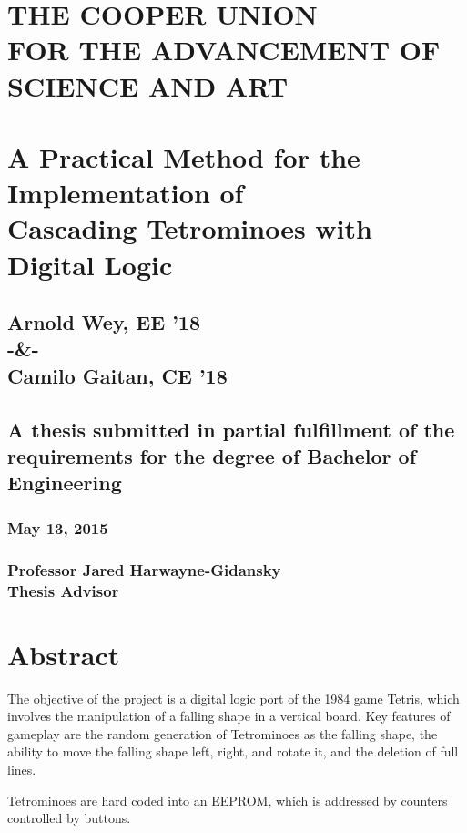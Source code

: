 \documentclass[letterpaper,titlepage,&1&pt,oneside]{article}
\begin{document}
\begin{center}
\section*{THE COOPER UNION \\FOR THE ADVANCEMENT OF SCIENCE AND ART\\[35pt]}
\section*{A Practical Method for the Implementation of \\Cascading Tetrominoes with Digital Logic\\[35pt]}
\subsection*{Arnold Wey, EE '18 \\[15pt]-\&-\\[15pt] Camilo Gaitan, CE '18\\[75pt]}
\subsection*{A thesis submitted in partial fulfillment of the requirements for the degree of Bachelor of Engineering\\[75pt]}
\subsubsection*{May 13, 2015\\[60pt]}
\subsubsection*{Professor Jared Harwayne-Gidansky\\[5pt]Thesis Advisor}
\end{center}
\pagebreak
\tableofcontents
\pagebreak
\pagestyle{headings}
\section{Abstract}
The objective of the project is a digital logic port of the 1984 game Tetris, which involves the manipulation of a falling shape in a vertical board. Key features of gameplay are the random generation of Tetrominoes as the falling shape, the ability to move the falling shape left, right, and rotate it, and the deletion of full lines. 

Tetrominoes are hard coded into an EEPROM, which is addressed by counters controlled by buttons.
\end{document}
